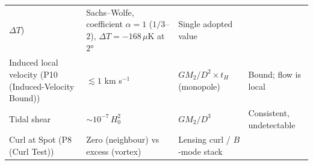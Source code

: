 \documentclass[
]{article}
\begin{document}
\begin{longtable}[]{@{}llll@{}}
\begin{minipage}[t]{0.22\columnwidth}
\(\Delta T\))\strut
\end{minipage} & \begin{minipage}[t]{0.22\columnwidth}\raggedright
Sachs--Wolfe, coefficient \(\alpha = 1\) (\(1/3\)--\(2\)),
\(\Delta T = -168\,\mu\)K at \(2°\)\strut
\end{minipage} & \begin{minipage}[t]{0.22\columnwidth}\raggedright
Single adopted value\strut
\end{minipage}\tabularnewline
\begin{minipage}[t]{0.22\columnwidth}\raggedright
Induced local velocity (P10 (Induced-Velocity Bound))\strut
\end{minipage} & \begin{minipage}[t]{0.22\columnwidth}\raggedright
\(\lesssim 1\) km s\(^{-1}\)\strut
\end{minipage} & \begin{minipage}[t]{0.22\columnwidth}\raggedright
\(GM_2/D^2 \times t_H\) (monopole)\strut
\end{minipage} & \begin{minipage}[t]{0.22\columnwidth}\raggedright
Bound; flow is local\strut
\end{minipage}\tabularnewline
\begin{minipage}[t]{0.22\columnwidth}\raggedright
Tidal shear\strut
\end{minipage} & \begin{minipage}[t]{0.22\columnwidth}\raggedright
\(\sim\!10^{-7}\,H_0^2\)\strut
\end{minipage} & \begin{minipage}[t]{0.22\columnwidth}\raggedright
\(GM_2/D^3\)\strut
\end{minipage} & \begin{minipage}[t]{0.22\columnwidth}\raggedright
Consistent, undetectable\strut
\end{minipage}\tabularnewline
\begin{minipage}[t]{0.22\columnwidth}\raggedright
Curl at Spot (P8 (Curl Test))\strut
\end{minipage} & \begin{minipage}[t]{0.22\columnwidth}\raggedright
Zero (neighbour) vs excess (vortex)\strut
\end{minipage} & \begin{minipage}[t]{0.22\columnwidth}\raggedright
Lensing curl / \(B\)-mode stack\strut
\end{minipage} & \begin{minipage}[t]{0.22\columnwidth}\raggedright

\end{minipage}
\end{longtable}
\end{document}
